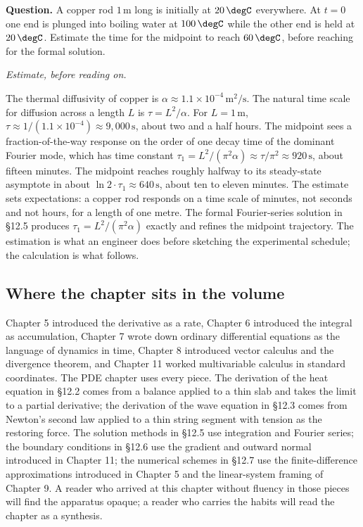 \begin{estimation}
\textbf{Question.} A copper rod $1\,\si{\meter}$ long is initially
at $20\,\degC$ everywhere. At $t = 0$ one end is plunged into
boiling water at $100\,\degC$ while the other end is held at
$20\,\degC$. Estimate the time for the midpoint to reach
$60\,\degC$, before reaching for the formal solution.

\smallskip
\textit{Estimate, before reading on.}

\smallskip
The thermal diffusivity of copper is $\alpha \approx 1.1 \times
10^{-4}\,\si{\meter\squared\per\second}$. The natural time scale
for diffusion across a length $L$ is $\tau = L^{2}/\alpha$. For
$L = 1\,\si{\meter}$, $\tau \approx 1/(1.1 \times 10^{-4}) \approx
9{,}000\,\si{\second}$, about two and a half hours. The midpoint
sees a fraction-of-the-way response on the order of one decay
time of the dominant Fourier mode, which has time constant
$\tau_{1} = L^{2}/(\pi^{2}\alpha) \approx \tau/\pi^{2} \approx
920\,\si{\second}$, about fifteen minutes. The midpoint reaches
roughly halfway to its steady-state asymptote in about $\ln 2
\cdot \tau_{1} \approx 640\,\si{\second}$, about ten to eleven
minutes. The estimate sets expectations: a copper rod responds on
a time scale of minutes, not seconds and not hours, for a length
of one metre. The formal Fourier-series solution in §12.5
produces $\tau_{1} = L^{2}/(\pi^{2}\alpha)$ exactly and refines the
midpoint trajectory. The estimation is what an engineer does
before sketching the experimental schedule; the calculation is
what follows.
\end{estimation}

\subsection{Where the chapter sits in the volume}

Chapter 5 introduced the derivative as a rate, Chapter 6 introduced
the integral as accumulation, Chapter 7 wrote down ordinary
differential equations as the language of dynamics in time, Chapter
8 introduced vector calculus and the divergence theorem, and
Chapter 11 worked multivariable calculus in standard coordinates.
The PDE chapter uses every piece. The derivation of the heat
equation in §12.2 comes from a balance applied to a thin slab and
takes the limit to a partial derivative; the derivation of the
wave equation in §12.3 comes from Newton's second law applied to a
thin string segment with tension as the restoring force. The
solution methods in §12.5 use integration and Fourier series; the
boundary conditions in §12.6 use the gradient and outward normal
introduced in Chapter 11; the numerical schemes in §12.7 use the
finite-difference approximations introduced in Chapter 5 and the
linear-system framing of Chapter 9. A reader who arrived at this
chapter without fluency in those pieces will find the apparatus
opaque; a reader who carries the habits will read the chapter as a
synthesis.

